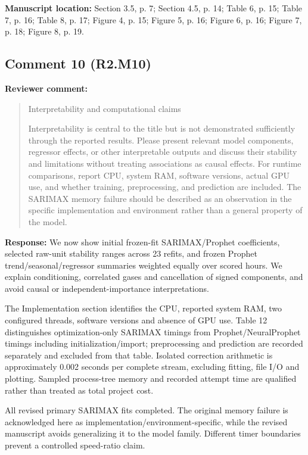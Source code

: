 \documentclass[11pt,a4paper]{article}
\begin{document}
\textbf{Manuscript location:} Section 3.5, p. 7; Section 4.5, p. 14; Table 6, p. 15; Table 7, p. 16; Table 8, p. 17; Figure 4, p. 15; Figure 5, p. 16; Figure 6, p. 16; Figure 7, p. 18; Figure 8, p. 19.
\begin{samepage}
\subsection*{Comment 10 (R2.M10)}
\textbf{Reviewer comment:}
\begin{quote}\small Interpretability and computational claims

Interpretability is central to the title but is not demonstrated sufficiently through the reported results. Please present relevant model components, regressor effects, or other interpretable outputs and discuss their stability and limitations without treating associations as causal effects. For runtime comparisons, report CPU, system RAM, software versions, actual GPU use, and whether training, preprocessing, and prediction are included. The SARIMAX memory failure should be described as an observation in the specific implementation and environment rather than a general property of the model.\end{quote}
\end{samepage}
\textbf{Response:}
We now show initial frozen-fit SARIMAX/Prophet coefficients, selected raw-unit stability ranges across 23 refits, and frozen Prophet trend/seasonal/regressor summaries weighted equally over scored hours. We explain conditioning, correlated gases and cancellation of signed components, and avoid causal or independent-importance interpretations.

The Implementation section identifies the CPU, reported system RAM, two configured threads, software versions and absence of GPU use. Table 12 distinguishes optimization-only SARIMAX timings from Prophet/NeuralProphet timings including initialization/import; preprocessing and prediction are recorded separately and excluded from that table. Isolated correction arithmetic is approximately 0.002 seconds per complete stream, excluding fitting, file I/O and plotting. Sampled process-tree memory and recorded attempt time are qualified rather than treated as total project cost.

All revised primary SARIMAX fits completed. The original memory failure is acknowledged here as implementation/environment-specific, while the revised manuscript avoids generalizing it to the model family. Different timer boundaries prevent a controlled speed-ratio claim.
\end{document}
